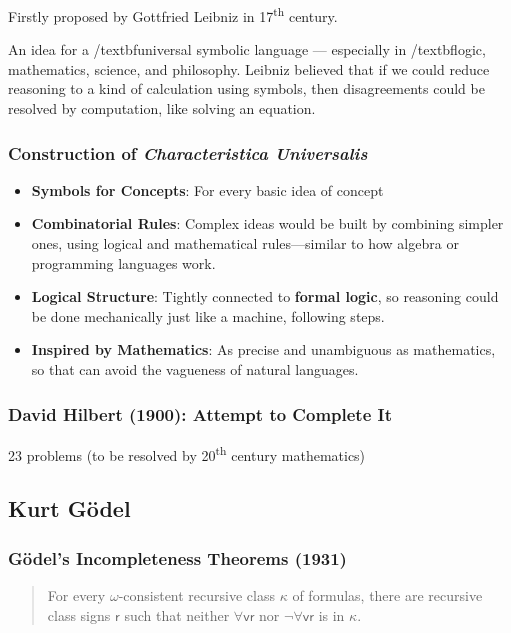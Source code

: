 \documentclass[a4paper, openany]{book}
\begin{document}
Firstly proposed by Gottfried Leibniz in 17\textsuperscript{th} century.

An idea for a /textbf{universal symbolic language} --- especially in /textbf{logic, mathematics, science, and philosophy}. Leibniz believed that if we could reduce reasoning to a kind of calculation using symbols, then disagreements could be resolved by computation, like solving an equation.

\subsubsection{Construction of \textit{Characteristica Universalis}}

\begin{itemize}
  \item \textbf{Symbols for Concepts}: For every basic idea of concept
  \item \textbf{Combinatorial Rules}: Complex ideas would be built by combining simpler ones, using logical and mathematical rules—similar to how algebra or programming languages work.
  \item \textbf{Logical Structure}: Tightly connected to \textbf{formal logic}, so reasoning could be done mechanically just like a machine, following steps.
  \item \textbf{Inspired by Mathematics}: As precise and unambiguous as mathematics, so that can avoid the vagueness of natural languages.
\end{itemize}

\subsubsection{David Hilbert (1900): Attempt to Complete It}

23 problems (to be resolved by 20\textsuperscript{th} century mathematics)

\subsection{Kurt Gödel}

\subsubsection{Gödel's Incompleteness Theorems (1931)}

\begin{quote}
  For every $\omega$-consistent recursive class $\kappa$ of formulas, there are recursive class signs $\mathsf{r}$ such that neither $\forall \mathsf{vr}$ nor $\neg \forall \mathsf{vr}$ is in $\kappa$.
\end{quote}
\end{document}
